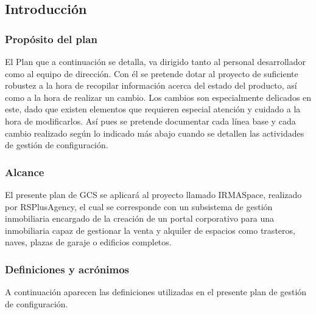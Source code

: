 \subsection{Introducción}

\subsubsection{Propósito del plan}
\par El Plan que a continuación se detalla, va dirigido tanto al personal desarrollador como al equipo de dirección.
Con él se pretende dotar al proyecto de suficiente robustez a la hora de recopilar información acerca del estado
del producto, así como a la hora de realizar un cambio. Los cambios son especialmente delicados en este,
dado que existen elementos que requieren especial atención y cuidado a la hora de modificarlos. Así pues se
pretende documentar cada línea base y cada cambio realizado según lo indicado más abajo cuando se detallen
las actividades de gestión de configuración.

\subsubsection{Alcance}
\par El presente plan de GCS se aplicará al proyecto llamado IRMASpace, realizado por RSPlusAgency,
el cual se corresponde con un subsistema de gestión inmobiliaria encargado de la creación de un portal  corporativo para una inmobiliaria capaz de gestionar la venta y alquiler de espacios como trasteros, naves, plazas de garaje o edificios completos.

\subsubsection{Definiciones y acrónimos}
\par A continuación aparecen las definiciones utilizadas en el presente plan de gestión de configuración.

